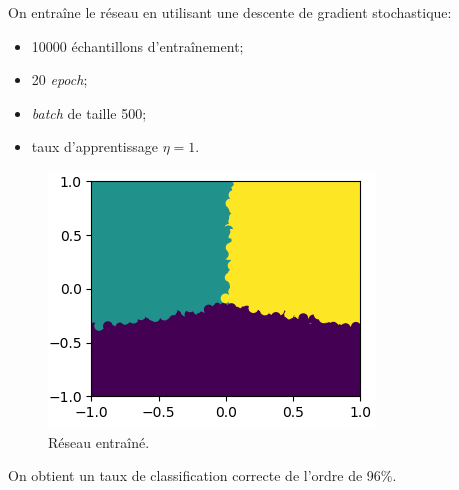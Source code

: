 \documentclass[ebook,10pt,oneside,openany,final, french, a4paper]{memoir}
\begin{document}
On entraîne le réseau en utilisant une descente de gradient stochastique:
\begin{itemize}
  \item 10000 échantillons d'entraînement;
  \item 20 \textit{epoch};
  \item \textit{batch} de taille 500;
  \item taux d'apprentissage $\eta = 1$.
\end{itemize}

\begin{figure}[h]
  \centering
  \includegraphics[scale=0.6]{assets/trained}
  \caption{Réseau entraîné.}
\end{figure}

On obtient un taux de classification correcte de l'ordre de 96\%.
\end{document}

